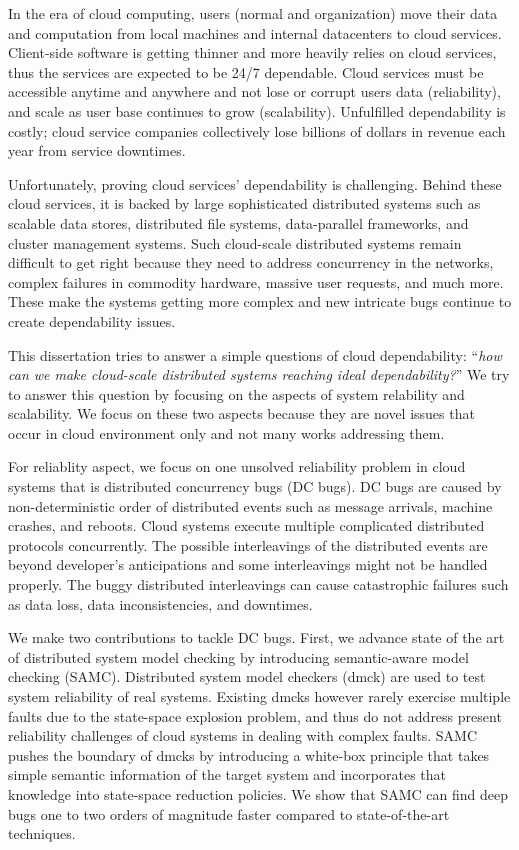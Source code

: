 In the era of cloud computing, users (normal and organization) move their data
and computation from local machines and internal datacenters to cloud services.
Client-side software is getting thinner and more heavily relies on cloud
services, thus the services are expected to be 24/7 dependable. Cloud services
must be accessible anytime and anywhere and not lose or corrupt users data
(reliability), and scale as user base continues to grow (scalability).
Unfulfilled dependability is costly; cloud service companies collectively lose
billions of dollars in revenue each year from service downtimes.

Unfortunately, proving cloud services' dependability is challenging. Behind
these cloud services, it is backed by large sophisticated distributed systems
such as scalable data stores, distributed file systems, data-parallel
frameworks, and cluster management systems. Such cloud-scale distributed systems
remain difficult to get right because they need to address concurrency in the
networks, complex failures in commodity hardware, massive user requests, and
much more. These make the systems getting more complex and new intricate bugs
continue to create dependability issues.

This dissertation tries to answer a simple questions of cloud dependability:
``{\em how can we make cloud-scale distributed systems reaching ideal
dependability?}'' We try to answer this question by focusing on the aspects of
system relability and scalability. We focus on these two aspects because they
are novel issues that occur in cloud environment only and not many works
addressing them.

For reliablity aspect, we focus on one unsolved reliability problem in cloud
systems that is distributed concurrency bugs (DC bugs). DC bugs are caused by
non-deterministic order of distributed events such as message arrivals, machine
crashes, and reboots. Cloud systems execute multiple complicated distributed
protocols concurrently. The possible interleavings of the distributed events are
beyond developer's anticipations and some interleavings might not be handled
properly. The buggy distributed interleavings can cause catastrophic failures
such as data loss, data inconsistencies, and downtimes.

We make two contributions to tackle DC bugs. First, we advance state of the art
of distributed system model checking by introducing semantic-aware model
checking (SAMC). Distributed system model checkers (dmck) are used to test
system reliability of real systems. Existing dmcks however rarely exercise
multiple faults due to the state-space explosion problem, and thus do not
address present reliability challenges of cloud systems in dealing with complex
faults. SAMC pushes the boundary of dmcks by introducing a white-box principle
that takes simple semantic information of the target system and incorporates
that knowledge into state-space reduction policies.  We show that SAMC can find
deep bugs one to two orders of magnitude faster compared to state-of-the-art
techniques. 


